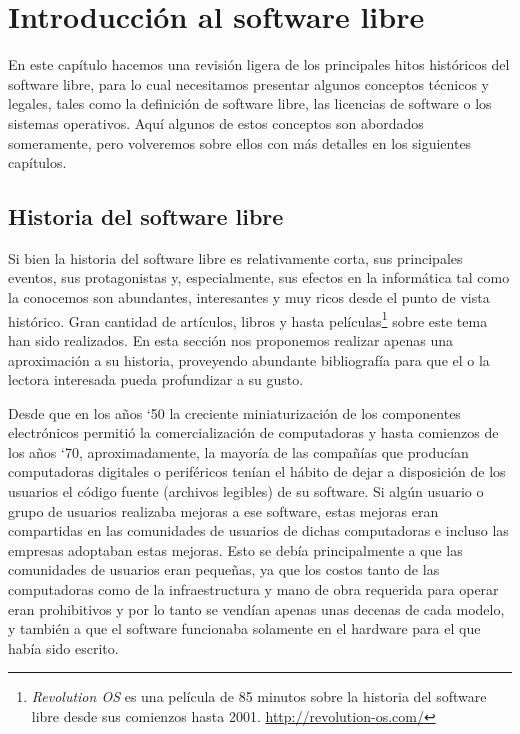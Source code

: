 \chapter{Introducción al software libre}
\label{capIntro}


En este capítulo hacemos una revisión ligera de los principales hitos históricos del software libre, para lo cual necesitamos presentar algunos conceptos técnicos y legales, tales como la definición de software libre, las licencias de software o los sistemas operativos. Aquí algunos de estos conceptos son abordados someramente, pero volveremos sobre ellos con más detalles en los siguientes capítulos.

\section{Historia del software libre}

Si bien la historia del software libre es relativamente corta, sus principales eventos, sus protagonistas y, especialmente, sus efectos en la informática tal como la conocemos son abundantes, interesantes y muy ricos desde el punto de vista histórico. Gran cantidad de artículos, libros y hasta películas\footnote{\emph{Revolution OS} es una película de 85 minutos sobre la historia del software libre desde sus comienzos hasta 2001. \url{http://revolution-os.com/}} sobre este tema han sido realizados. En esta sección nos proponemos realizar apenas una aproximación a su historia, proveyendo abundante bibliografía para que el o la lectora interesada pueda profundizar a su gusto.

Desde que en los años `50 la creciente miniaturización de los componentes electrónicos permitió la comercialización de computadoras y hasta comienzos de los años `70, aproximadamente, la mayoría de las compañías que producían computadoras digitales o periféricos tenían el hábito de dejar a disposición de los usuarios el código fuente (archivos legibles) de su software. Si algún usuario o grupo de usuarios realizaba mejoras a ese software, estas mejoras eran compartidas en las comunidades de usuarios de dichas computadoras e incluso las empresas adoptaban estas mejoras. Esto se debía principalmente a que las comunidades de usuarios eran pequeñas, ya que los costos tanto de las computadoras como de la infraestructura y mano de obra requerida para operar eran prohibitivos y por lo tanto se vendían apenas unas decenas de cada modelo, y también a que el software funcionaba solamente en el hardware para el que había sido escrito.

